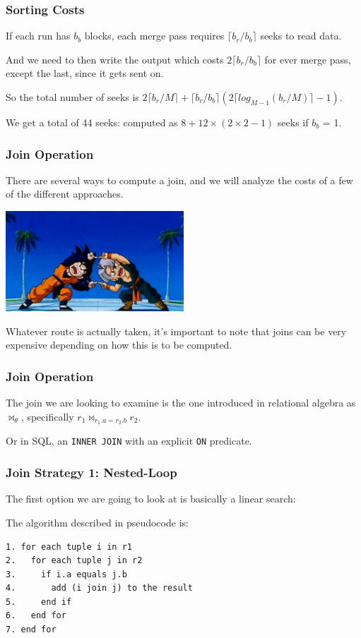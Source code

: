\begin{frame}
\frametitle{Sorting Costs}

If each run has $b_{b}$ blocks, each merge pass requires $\lceil b_{r}/b_{b}\rceil$ seeks to read data. 

And we need to then write the output which costs  $2\lceil b_{r}/b_{b}\rceil$ for ever merge pass, except the last, since it gets sent on. 

So the total number of seeks is $2\lceil b_{r}/M\rceil + \lceil b_{r}/b_{b}\rceil(2 \lceil log_{M-1}(b_{r}/M)\rceil - 1)$.


We get a total of 44 seeks: computed as $8 + 12 \times (2 \times 2 - 1)$ seeks if $b_{b}$ = 1.

\end{frame}

\begin{frame}
\frametitle{Join Operation}

There are several ways to compute a join, and we will analyze the costs of a few of the different approaches. 

\begin{center}
	\includegraphics[width=0.5\textwidth]{images/fusion.jpg}
\end{center}

Whatever route is actually taken, it's important to note that joins can be very expensive depending on how this is to be computed. 


\end{frame}

\begin{frame}
\frametitle{Join Operation}

The join we are looking to examine is the one introduced in relational algebra as $\Join_{\theta}$, specifically $r_{1} \Join_{r_{1}.a = r_{2}.b} r_{2}$.

Or in SQL, an \texttt{INNER JOIN} with an explicit \texttt{ON} predicate. 

\end{frame}

\begin{frame}[fragile]
\frametitle{Join Strategy 1: Nested-Loop}

The first option we are going to look at is basically a linear search:

The algorithm described in pseudocode is:
\begin{verbatim}
1. for each tuple i in r1
2.   for each tuple j in r2
3.     if i.a equals j.b
4.       add (i join j) to the result
5.     end if
6.   end for
7. end for
\end{verbatim}

\end{frame}

